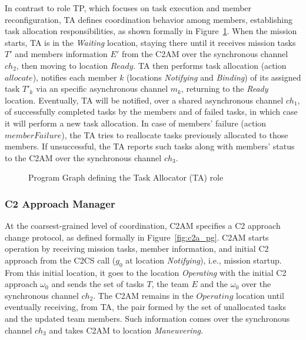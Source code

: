 In contrast to role TP, which focuses on task execution and member reconfiguration, TA defines coordination behavior among members, establishing task allocation responsibilities, as shown formally in Figure~\ref{fig:ta_pg}. When the mission starts, TA is in the \textit{Waiting} location, staying there until it receives mission tasks $T'$ and members information $E'$ from the C2AM over the synchronous channel $ch_2$, then moving to location $Ready$. TA then performs task allocation (action $allocate$),  notifies each member $k$ (locations \textit{Notifying} and \textit{Binding}) of its assigned task 
$T'_k$ via an specific asynchronous channel $m_k$, returning to the \textit{Ready} location. Eventually, TA will be notified, over a shared asynchronous channel $ch_1$, of successfully completed tasks by the members and of failed tasks, in which case it will perform a new task allocation. In case of members' failure (action $memberFailure$), the TA tries to reallocate tasks previously allocated to those members. If unsuccessful, the TA reports such tasks along with members' status to the C2AM over the synchronous channel $ch_3$. 



\begin{figure}[ht!]
    \centering
    \scalebox{.75}{}
    \caption{Program Graph defining the Task Allocator (TA) role}
    \label{fig:ta_pg}
\end{figure}


\subsubsection{C2 Approach Manager}

At the coarsest-grained level of coordination, C2AM specifies a C2 approach change protocol, as defined formally in Figure~\ref{fig:c2a_pg}. C2AM starts operation by receiving mission tasks, member information, and initial C2 approach from the C2CS call ($g_0$ at location \textit{Notifying}), i.e., mission startup. From this initial location, it goes to the location \textit{Operating} with the initial C2 approach $\omega_0$ and sends the set of tasks $T$, the team $E$ and the $\omega_0$ over the synchronous channel $ch_2$. The C2AM remains in the $Operating$ location until eventually receiving, from TA, the pair formed by the set of unallocated tasks and the updated team members. Such information comes over the synchronous channel $ch_3$ and takes C2AM to location \textit{Maneuvering}.

